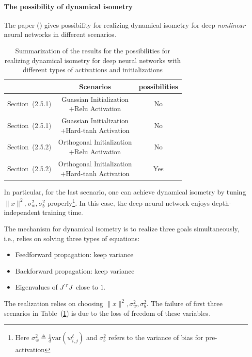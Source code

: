 \paragraph{The possibility of dynamical isometry}
The paper (\cite{DBLP}) gives possibility for realizing dynamical isometry for deep \emph{nonlinear} neural networks in different scenarios.
\begin{table}[H]
  \centering
    \caption{Summarization of the results for the possibilities for realizing dynamical isometry for deep neural networks with different types of activations and initializations}
  \label{tab:1}
  \begin{tabular}{ccc}
    \toprule
    &  Scenarios & possibilities\\
    \midrule
    Section~(2.5.1)  & \tabincell{c}{Guassian Initialization\\ +Relu Activation} & No \\\hline

    Section~(2.5.1)  & \tabincell{c}{Guassian Initialization\\ +Hard-tanh Activation} & No \\\hline
    Section~(2.5.2)  & \tabincell{c}{Orthogonal Initialization\\ +Relu Activation} & No \\\hline
    Section~(2.5.2)  & \tabincell{c}{Orthogonal Initialization\\ +Hard-tanh Activation} & Yes \\
    \bottomrule
  \end{tabular}
\end{table}
In particular, for the last scenario, one can achieve dynamical isometry by tuning $\|x\|^2,\sigma_w^2,\sigma_b^2$ properly\footnote{Here $\sigma_w^2\triangleq\frac{1}{d}\text{var}(w_{i,j}^{\ell})$ and $\sigma_b^2$ refers to the variance of bias for pre-activation}. In this case, the deep neural network enjoys depth-independent training time.

The mechanism for dynamical isometry is to realize three goals simultaneously, i.e., relies on solving three types of equations:
\begin{itemize}
\item
Feedforward propagation: keep variance
\item
Backforward propagation: keep variance
\item
Eigenvalues of $J^{\mathrm T} J$ close to $1$.
\end{itemize}
The realization relies on choosing $\|x\|^2,\sigma_w^2,\sigma_b^2$. The failure of first three scenarios in Table~(\ref{tab:1}) is due to the loss of freedom of these variables.

